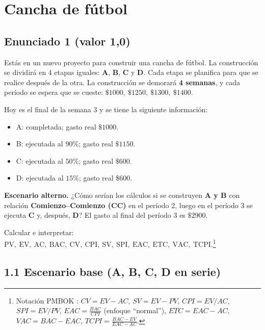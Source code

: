 \section{Cancha de fútbol}

\subsection*{Enunciado 1 (valor 1,0)}
Estás en un nuevo proyecto para construir una cancha de fútbol. La construcción se dividirá en 4 etapas iguales: \textbf{A}, \textbf{B}, \textbf{C} y \textbf{D}. Cada etapa se planifica para que se realice después de la otra. La construcción se demorará \textbf{4 semanas}, y cada período se espera que se cueste: \(\$1000,~\$1250,~\$1300,~\$1400\).

\medskip
Hoy es el final de la semana 3 y se tiene la siguiente información:
\begin{itemize}
  \item A: completada; gasto real \(\$1000\).
  \item B: ejecutada al \(90\%\); gasto real \(\$1150\).
  \item C: ejecutada al \(50\%\); gasto real \(\$600\).
  \item D: ejecutada al \(15\%\); gasto real \(\$600\).
\end{itemize}

\noindent
\textbf{Escenario alterno.} ¿Cómo serían los cálculos si se construyen \textbf{A y B} con relación \textbf{Comienzo--Comienzo (CC)} en el período 2, luego en el período 3 se ejecuta \textbf{C} y, después, \textbf{D}? El gasto al final del período 3 es \(\$2900\).

\medskip
Calcular e interpretar:
\(\mathrm{PV,~EV,~AC,~BAC,~CV,~CPI,~SV,~SPI,~EAC,~ETC,~VAC,~TCPI}\).\footnote{Notación PMBOK \cite{PMBOK}: \(CV=EV-AC\), \(SV=EV-PV\), \(CPI=EV/AC\), \(SPI=EV/PV\), \(EAC=\frac{BAC}{CPI}\) (enfoque ``normal''), \(ETC=EAC-AC\), \(VAC= BAC - EAC\), \(TCPI=\frac{BAC-EV}{EAC-AC}\).}

\subsection{1.1 Escenario base (A, B, C, D en serie)}
\label{subsec:cancha-11}

